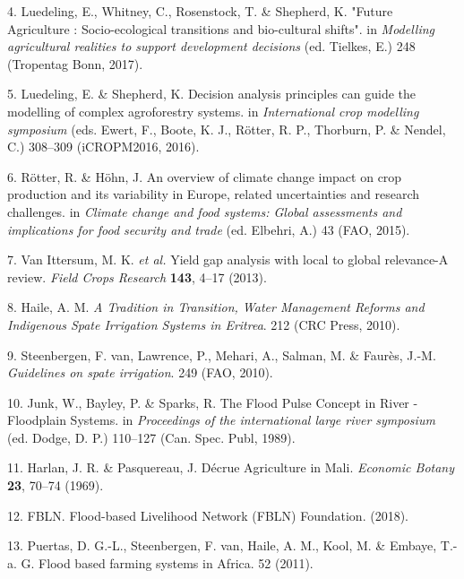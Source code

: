\documentclass[12pt,oneside]{article}
\begin{document}
\leavevmode\hypertarget{ref-Luedeling_et_al_2017}{}%
4. Luedeling, E., Whitney, C., Rosenstock, T. \& Shepherd, K. "Future Agriculture : Socio-ecological transitions and bio-cultural shifts". in \emph{Modelling agricultural realities to support development decisions} (ed. Tielkes, E.) 248 (Tropentag Bonn, 2017).

\leavevmode\hypertarget{ref-Luedeling_and_Shepherd_2016}{}%
5. Luedeling, E. \& Shepherd, K. Decision analysis principles can guide the modelling of complex agroforestry systems. in \emph{International crop modelling symposium} (eds. Ewert, F., Boote, K. J., Rötter, R. P., Thorburn, P. \& Nendel, C.) 308--309 (iCROPM2016, 2016).

\leavevmode\hypertarget{ref-Rotter_and_Hohn_2015}{}%
6. Rötter, R. \& Höhn, J. An overview of climate change impact on crop production and its variability in Europe, related uncertainties and research challenges. in \emph{Climate change and food systems: Global assessments and implications for food security and trade} (ed. Elbehri, A.) 43 (FAO, 2015).

\leavevmode\hypertarget{ref-VanIttersum_et_al_2013}{}%
7. Van Ittersum, M. K. \emph{et al.} Yield gap analysis with local to global relevance-A review. \emph{Field Crops Research} \textbf{143}, 4--17 (2013).

\leavevmode\hypertarget{ref-Haile_2010}{}%
8. Haile, A. M. \emph{A Tradition in Transition, Water Management Reforms and Indigenous Spate Irrigation Systems in Eritrea}. 212 (CRC Press, 2010).

\leavevmode\hypertarget{ref-VanSteenbergen_et_al_2010}{}%
9. Steenbergen, F. van, Lawrence, P., Mehari, A., Salman, M. \& Faurès, J.-M. \emph{Guidelines on spate irrigation}. 249 (FAO, 2010).

\leavevmode\hypertarget{ref-Junk_et_al_1989}{}%
10. Junk, W., Bayley, P. \& Sparks, R. The Flood Pulse Concept in River - Floodplain Systems. in \emph{Proceedings of the international large river symposium} (ed. Dodge, D. P.) 110--127 (Can. Spec. Publ, 1989).

\leavevmode\hypertarget{ref-Harlan_Pasquereau_1969}{}%
11. Harlan, J. R. \& Pasquereau, J. Décrue Agriculture in Mali. \emph{Economic Botany} \textbf{23}, 70--74 (1969).

\leavevmode\hypertarget{ref-FBLN_2018}{}%
12. FBLN. Flood-based Livelihood Network (FBLN) Foundation. (2018).

\leavevmode\hypertarget{ref-Puertas_et_al_2011}{}%
13. Puertas, D. G.-L., Steenbergen, F. van, Haile, A. M., Kool, M. \& Embaye, T.-a. G. Flood based farming systems in Africa. 52 (2011).
\end{document}
